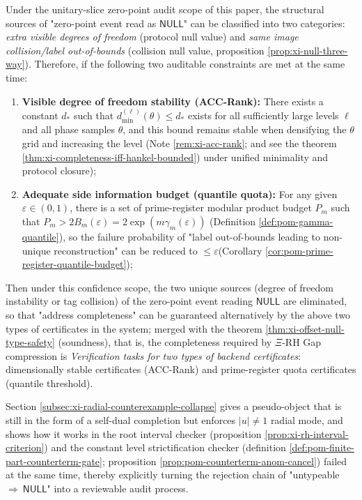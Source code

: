 \begin{proposition}\label{prop:xi-completeness-auditable-decomposition}
Under the unitary-slice zero-point audit scope of this paper, the structural sources of "zero-point event read as \(\mathsf{NULL}\)" can be classified into two categories: \emph{extra visible degrees of freedom} (protocol null value) and \emph{same image collision/label out-of-bounds} (collision null value, proposition \ref{prop:xi-null-three-way}).
Therefore, if the following two auditable constraints are met at the same time:
\begin{enumerate}
  \item \textbf{Visible degree of freedom stability (ACC-Rank):} There exists a constant \(d_\ast\) such that \(d^{(\ell)}_{\min}(\theta)\le d_\ast\) exists for all sufficiently large levels \(\ell\) and all phase samples \(\theta\), and this bound remains stable when densifying the \(\theta\) grid and increasing the level (Note \ref{rem:xi-acc-rank}; and see the theorem \ref{thm:xi-completeness-iff-hankel-bounded}) under unified minimality and protocol closure);
  \item \textbf{Adequate side information budget (quantile quota):} For any given \(\varepsilon\in(0,1)\), there is a set of prime-register modular product budget \(P_m\) such that
  \(
  P_m>2B_m(\varepsilon)=2\exp(m\gamma_m(\varepsilon))
  \)
  (Definition \ref{def:pom-gamma-quantile}), so the failure probability of "label out-of-bounds leading to non-unique reconstruction" can be reduced to \(\le\varepsilon\) ​​(Corollary \ref{cor:pom-prime-register-quantile-budget});
\end{enumerate}
Then under this confidence scope, the two unique sources (degree of freedom instability or tag collision) of the zero-point event reading \(\mathsf{NULL}\) are eliminated, so that "address completeness" can be guaranteed alternatively by the above two types of certificates in the system; merged with the theorem \ref{thm:xi-offset-null-type-safety} (soundness), that is, the completeness required by \(\Xi\)-RH Gap compression is \emph{Verification tasks for two types of backend certificates}: dimensionally stable certificates (ACC-Rank) and prime-register quota certificates (quantile threshold).
\end{proposition}

\begin{remark}\label{rem:xi-radial-collapse-template}
Section \ref{subsec:xi-radial-counterexample-collapse} gives a pseudo-object that is still in the form of a self-dual completion but enforces \(|u|\neq 1\) radial mode, and shows how it works in the root interval checker (proposition \ref{prop:xi-rh-interval-criterion}) and the constant level strictification checker (definition \ref{def:pom-finite-part-counterterm-gate}; proposition \ref{prop:pom-counterterm-anom-cancel}) failed at the same time, thereby explicitly turning the rejection chain of "untypeable \(\Rightarrow\ \mathsf{NULL}\)" into a reviewable audit process.
\end{remark}

